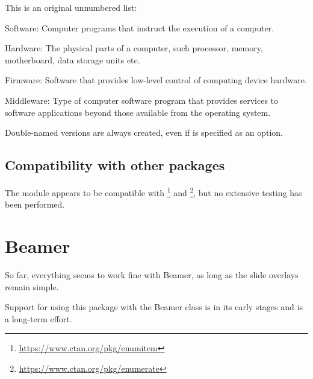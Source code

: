 \documentclass[a4paper, 11pt]{article}
\begin{document}
\bigskip
\begin{example}{}
    This is an original unnumbered list:

    \begin{itemizeitemize}
        \item Software: Computer programs that instruct the execution of a computer.
        \item Hardware: The physical parts of a computer, such processor, memory, motherboard, data storage units etc.
        \item Firmware: Software that provides low-level control of computing device hardware.
        \item Middleware: Type of computer software program that provides services to software applications beyond those available from the operating system.
    \end{itemizeitemize}
\end{example}

Double-named versions are always created, even if  is specified as an option.

\subsection{Compatibility with other packages}

The module  appears to be compatible with \footnote{\url{https://www.ctan.org/pkg/enumitem}} and \footnote{\url{https://www.ctan.org/pkg/enumerate}}, but no extensive testing has been performed.

\section{Beamer}

So far, everything seems to work fine with Beamer, as long as the slide overlays remain simple.

Support for using this package with the Beamer class is in its early stages and is a long-term effort.

%
\end{document}
